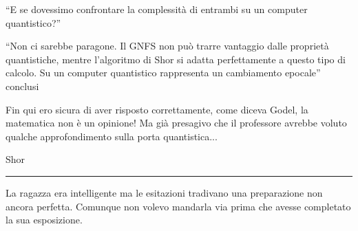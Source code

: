 \begin{dialogue}
 \enquote{E se dovessimo confrontare la complessità di entrambi su un computer quantistico?}

 \enquote{Non ci sarebbe paragone. Il GNFS non può trarre vantaggio dalle proprietà quantistiche, mentre l'algoritmo di Shor si adatta perfettamente a questo tipo di calcolo. Su un computer quantistico rappresenta un cambiamento epocale} conclusi

\end{dialogue}

Fin qui ero sicura di aver risposto correttamente, come diceva Godel, la matematica non è un opinione! Ma già presagivo che il professore avrebbe voluto qualche approfondimento sulla porta quantistica...


\vspace{1em}
\begin{center}Shor\end{center}
\hrule
\vspace{1em}
La ragazza era intelligente ma le esitazioni tradivano una preparazione non ancora perfetta. Comunque non volevo mandarla via prima che avesse completato la sua esposizione.
